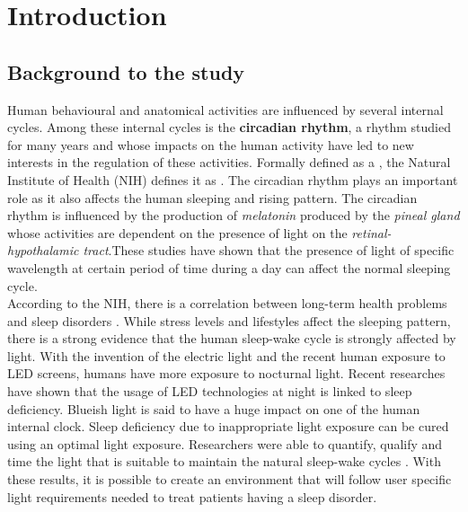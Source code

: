 \chapter{Introduction}\label{introduction}

\section{Background to the study}

Human behavioural and anatomical activities are influenced by several internal cycles. Among these internal cycles is the \textbf{circadian rhythm}, a rhythm studied for many years and whose impacts on the human activity have led to new interests in the regulation of these activities. Formally defined as a  \cite{ge2014}, the Natural Institute of Health (NIH) defines it as \cite{ge2014}. The circadian rhythm plays an important role as it also affects the human sleeping and rising pattern. The circadian rhythm is influenced by the production of \textit{melatonin} produced by the \textit{pineal gland} whose activities are dependent on the presence of light on the \textit{retinal-hypothalamic tract}\cite{lig1994}.These studies have shown that the presence of light of specific wavelength at certain period of time during a day can affect the normal sleeping cycle.\\   
According to the NIH, there is a correlation between long-term health problems and sleep disorders \cite{ph2002}. While stress levels and lifestyles affect the sleeping pattern, there is a strong evidence that the human sleep-wake cycle is strongly affected by light. With the invention of the electric light and the recent human exposure to LED screens, humans have more exposure to nocturnal light. Recent researches have shown that the usage of LED technologies at night is linked to sleep deficiency. Blueish light is said to have a huge impact on one of the human internal clock\cite{bl2010}. Sleep deficiency due to inappropriate light exposure can be cured using an optimal light exposure\cite{bl2010}. Researchers were able to quantify, qualify and time the light that is suitable to maintain the natural sleep-wake cycles \cite{cir2014}. With these results, it is possible to create an environment that will follow user specific light requirements needed to treat patients having a sleep disorder.



